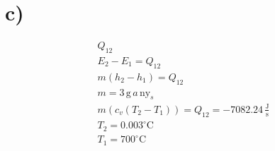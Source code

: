 

\section*{c)}

\begin{align*}
Q_{12} \\
E_2 - E_1 = Q_{12} \\
m(h_2 - h_1) = Q_{12} \\
m = 3 \, \text{g} \, a \, \text{ny}_s \\
m(c_v(T_2 - T_1)) = Q_{12} = -7082.24 \, \frac{\text{J}}{\text{s}} \\
T_2 = 0.003^\circ \text{C} \\
T_1 = 700^\circ \text{C}
\end{align*}
